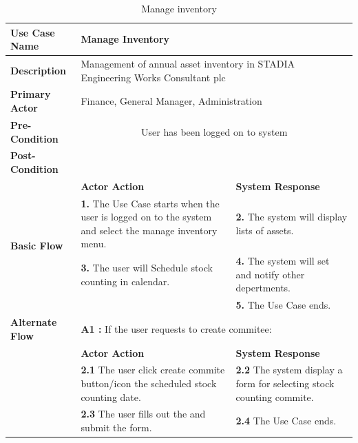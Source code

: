 \begin{table}[!h]
\begin{tabular}{|l|p{6cm}|p{6cm}|}
\hline 
\rule[-1ex]{0pt}{2.5ex} \textbf{Use Case Name} & \multicolumn{2}{p{10cm}|}{Manage Inventory} \\ 
\hline 
\rule[-1ex]{0pt}{2.5ex} \textbf{Description} &\multicolumn{2}{p{10cm}|}{Management of annual asset inventory in STADIA Engineering Works Consultant plc} \\ 
\hline 
\rule[-1ex]{0pt}{2.5ex} \textbf{Primary Actor}& \multicolumn{2}{p{10cm}|}{Finance, General 
Manager, Administration} \\ 
\hline 
\rule[-1ex]{0pt}{2.5ex} \textbf{Pre-Condition} & \multicolumn{2}{c|}{User has been logged on to system} \\ 
\hline 
\rule[-1ex]{0pt}{2.5ex} \textbf{Post-Condition} & \multicolumn{2}{p{10cm}|}{}  \\ 
\hline 
\multirow{4}{*}{\textbf{Basic Flow}} & \textbf{Actor Action} & \textbf{System Response}\\
\cline{2-3}
%
&
\textbf{1.}  The Use Case starts when the user is logged on to the system and select the manage inventory menu.
& 
\textbf{2.}  The system will display lists of assets.
\\
%
&
\textbf{3.}  The user will Schedule stock counting in calendar.
& 
\textbf{4.}  The system will set and notify other depertments. 
\\
%
&

& 
\textbf{5.}  The Use Case ends. 
\\
\hline 
\rule[-1ex]{0pt}{2.5ex} \textbf{Alternate Flow} & \multicolumn{2}{p{10cm}|}{\textbf{A1 : } If the user requests to create commitee:}  \\ 
\cline{2-3}
\multirow{2}{*}{} & \textbf{Actor Action} & \textbf{System Response}\\
\cline{2-3}
%
&
\textbf{2.1}  The user click create commite button/icon the scheduled stock counting date. 
& 
\textbf{2.2}  The system display a form for selecting stock counting commite. 
\\
%
&
\textbf{2.3}  The user fills out the and submit the form. 
& 
\textbf{2.4}  The Use Case ends.  
\\
\hline
\end{tabular}
\caption{Manage inventory} 
\end{table}

